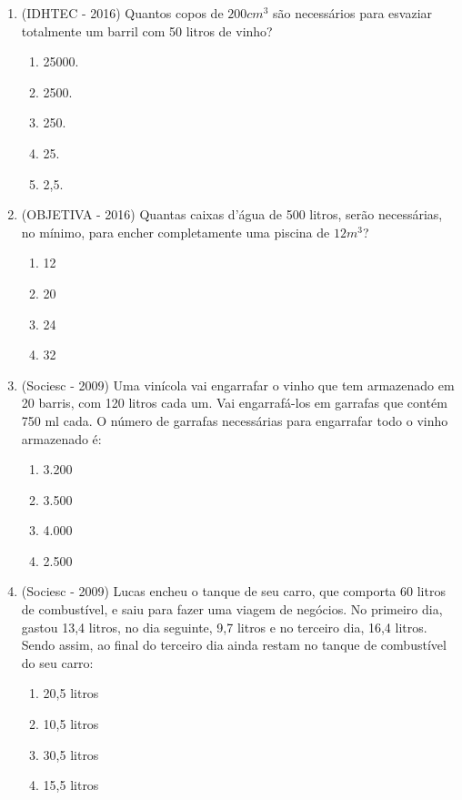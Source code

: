 \begin{enumerate}[1)]
 \item (IDHTEC - 2016) Quantos copos de $200 cm^3$ são necessários para esvaziar totalmente um barril com 50 litros de vinho?
 \begin{enumerate}
 \item 25000.
 \item 2500.
 \item 250.
 \item 25.
 \item 2,5.
\end{enumerate}

\item (OBJETIVA - 2016) Quantas caixas d’água de 500 litros, serão necessárias, no mínimo, para encher completamente uma piscina de $12m^3$?
\begin{enumerate}
 \item 12
 \item 20
 \item 24
 \item 32
\end{enumerate}

 \item (Sociesc - 2009) Uma vinícola vai engarrafar o vinho que tem armazenado em 20 barris, com 120 litros cada um. Vai engarrafá-los em garrafas que contém 750 ml cada. O número de garrafas necessárias para engarrafar todo o vinho armazenado é:
  \begin{enumerate}
  \item 3.200
  \item 3.500
  \item 4.000
  \item 2.500
 \end{enumerate}
 
  \item (Sociesc - 2009) Lucas encheu o tanque de seu carro, que comporta 60 litros de combustível, e saiu para fazer uma viagem de negócios. No primeiro dia, gastou 13,4 litros, no dia seguinte, 9,7 litros e no terceiro dia, 16,4 litros. Sendo assim, ao final do terceiro dia ainda restam no tanque de combustível do seu carro:
  \begin{enumerate}
  \item 20,5 litros
  \item 10,5 litros
  \item 30,5 litros
  \item 15,5 litros
 \end{enumerate}

\end{enumerate}

